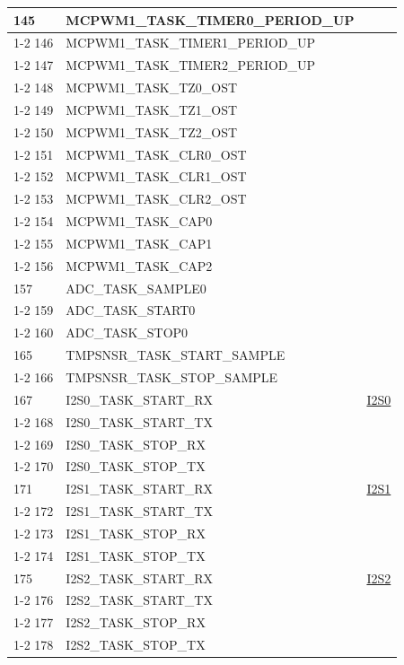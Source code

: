 \documentclass[main\_\_EN.tex]{subfiles}
\begin{document}
\begin{longtable}{ | l | l | l | }
145 & MCPWM1\_TASK\_TIMER0\_PERIOD\_UP      & \\ \cline{1-2}
146 & MCPWM1\_TASK\_TIMER1\_PERIOD\_UP      & \\ \cline{1-2}
147 & MCPWM1\_TASK\_TIMER2\_PERIOD\_UP      & \\ \cline{1-2}
148 & MCPWM1\_TASK\_TZ0\_OST  & \\ \cline{1-2}
149 & MCPWM1\_TASK\_TZ1\_OST  & \\ \cline{1-2}
150 & MCPWM1\_TASK\_TZ2\_OST  & \\ \cline{1-2}
151 & MCPWM1\_TASK\_CLR0\_OST & \\ \cline{1-2}
152 & MCPWM1\_TASK\_CLR1\_OST & \\ \cline{1-2}
153 & MCPWM1\_TASK\_CLR2\_OST & \\ \cline{1-2}
154 & MCPWM1\_TASK\_CAP0      & \\ \cline{1-2}
155 & MCPWM1\_TASK\_CAP1      & \\ \cline{1-2}
156 & MCPWM1\_TASK\_CAP2      & \\ \hline
157 & ADC\_TASK\_SAMPLE0     & \nameref{mod:adc}   \\ \cline{1-2}
159 & ADC\_TASK\_START0      & \\ \cline{1-2}
160 & ADC\_TASK\_STOP0& \\ \hline
165 & TMPSNSR\_TASK\_START\_SAMPLE  & \nameref{mod:tmpsen}      \\ \cline{1-2}
166 & TMPSNSR\_TASK\_STOP\_SAMPLE   & \\ \hline
167 & I2S0\_TASK\_START\_RX   & \hyperref[mod:i2s]{I2S0}   \\ \cline{1-2}
168 & I2S0\_TASK\_START\_TX   & \\ \cline{1-2}
169 & I2S0\_TASK\_STOP\_RX    & \\ \cline{1-2}
170 & I2S0\_TASK\_STOP\_TX    & \\ \hline
171 & I2S1\_TASK\_START\_RX   & \hyperref[mod:i2s]{I2S1}   \\ \cline{1-2}
172 & I2S1\_TASK\_START\_TX   & \\ \cline{1-2}
173 & I2S1\_TASK\_STOP\_RX    & \\ \cline{1-2}
174 & I2S1\_TASK\_STOP\_TX    & \\ \hline
175 & I2S2\_TASK\_START\_RX   & \hyperref[mod:i2s]{I2S2}   \\ \cline{1-2}
176 & I2S2\_TASK\_START\_TX   & \\ \cline{1-2}
177 & I2S2\_TASK\_STOP\_RX    & \\ \cline{1-2}
178 & I2S2\_TASK\_STOP\_TX    & \\ \hline

\end{longtable}
\end{document}

